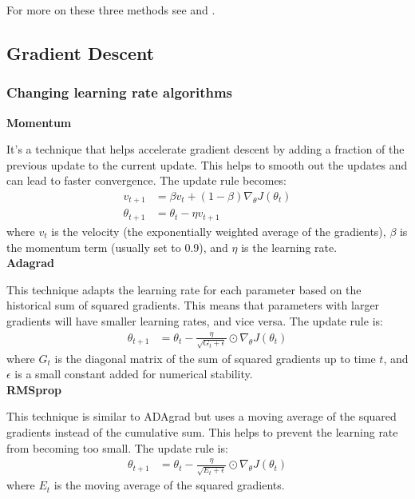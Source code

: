 \documentclass[amssymb,twocolumn,aps]{revtex4}
\begin{document}
For more on these three methods see \cite{compfys} and \cite{hastie}.
\subsection{Gradient Descent}

\subsubsection{Changing learning rate algorithms}
\textbf{Momentum}

It's a technique that helps accelerate gradient descent by adding a fraction of the previous update to the current update. This helps to smooth out the updates and can lead to faster convergence. The update rule becomes:
\begin{align*}
v_{t+1} &= \beta v_t + (1 - \beta) \nabla_{\theta} J(\theta_t) \\
\theta_{t+1} &= \theta_t - \eta v_{t+1}
\end{align*}
where $v_t$ is the velocity (the exponentially weighted average of the gradients), $\beta$ is the momentum term (usually set to 0.9), and $\eta$ is the learning rate.
\\

\textbf{Adagrad}

This technique adapts the learning rate for each parameter based on the historical sum of squared gradients. This means that parameters with larger gradients will have smaller learning rates, and vice versa. The update rule is:
\begin{align*}
\theta_{t+1} &= \theta_t - \frac{\eta}{\sqrt{G_t + \epsilon}} \odot \nabla_{\theta} J(\theta_t)
\end{align*}
where $G_t$ is the diagonal matrix of the sum of squared gradients up to time $t$, and $\epsilon$ is a small constant added for numerical stability.
\\

\textbf{RMSprop}

This technique is similar to ADAgrad but uses a moving average of the squared gradients instead of the cumulative sum. This helps to prevent the learning rate from becoming too small. The update rule is:
\begin{align*}
\theta_{t+1} &= \theta_t - \frac{\eta}{\sqrt{E_t + \epsilon}} \odot \nabla_{\theta} J(\theta_t)
\end{align*}
where $E_t$ is the moving average of the squared gradients.
\\
\end{document}
